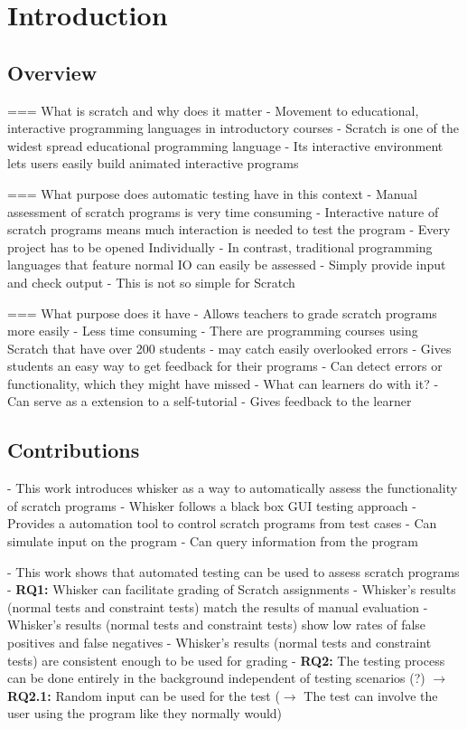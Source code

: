 \chapter{Introduction}

\section{Overview}
=== What is scratch and why does it matter
- Movement to educational, interactive programming languages in introductory courses
- Scratch is one of the widest spread educational programming language
- Its interactive environment lets users easily build animated interactive programs

=== What purpose does automatic testing have in this context
- Manual assessment of scratch programs is very time consuming
- Interactive nature of scratch programs means much interaction is needed to test the program
- Every project has to be opened Individually
- In contrast, traditional programming languages that feature normal IO can easily be assessed
- Simply provide input and check output
- This is not so simple for Scratch

=== What purpose does it have
- Allows teachers to grade scratch programs more easily
    - Less time consuming
        - There are programming courses using Scratch that have over 200 students \cite{itch}
    - may catch easily overlooked errors
    - Gives students an easy way to get feedback for their programs
        - Can detect errors or functionality, which they might have missed
- What can learners do with it?
    - Can serve as a extension to a self-tutorial
    - Gives feedback to the learner

\section{Contributions}
- This work introduces whisker as a way to automatically assess the functionality of scratch programs
- Whisker follows a black box GUI testing approach
- Provides a automation tool to control scratch programs from test cases
    - Can simulate input on the program
    - Can query information from the program

- This work shows that automated testing can be used to assess scratch programs
- \textbf{RQ1:} Whisker can facilitate grading of Scratch assignments
    - Whisker's results (normal tests and constraint tests) match the results of manual evaluation
    - Whisker's results (normal tests and constraint tests) show low rates of false positives and false negatives
    - Whisker's results (normal tests and constraint tests) are consistent enough to be used for grading
- \textbf{RQ2:} The testing process can be done entirely in the background independent of testing scenarios (?)
    $\rightarrow$ \textbf{RQ2.1:} Random input can be used for the test
    ($\rightarrow$ The test can involve the user using the program like they normally would)

